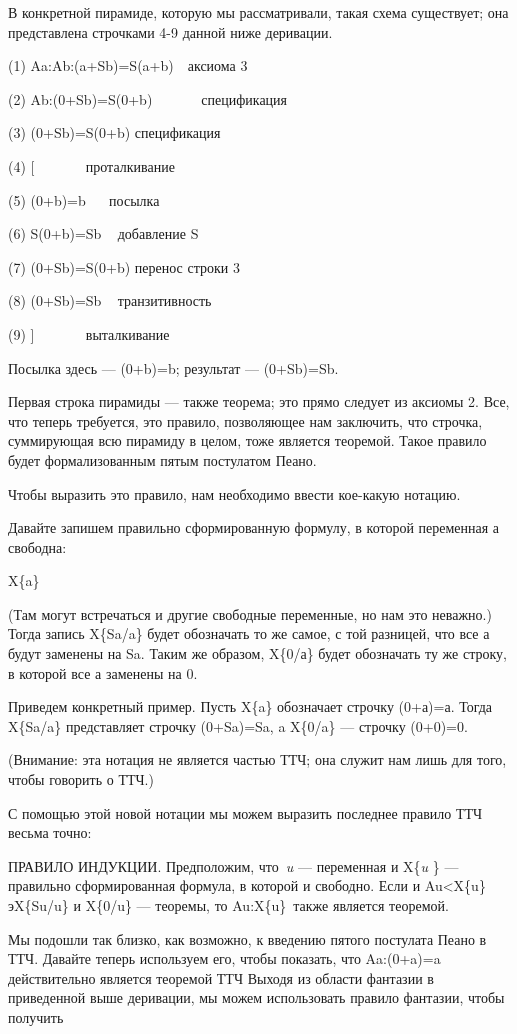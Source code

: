 \documentclass[../main.tex]{subfiles}
\begin{document}
В конкретной пирамиде, которую мы рассматривали, такая схема существует; она представлена строчками 4-9 данной ниже деривации.

(1) Aa:Ab:(a+Sb)=S(a+b)~~аксиома 3

(2) Ab:(0+Sb)=S(0+b)~~~~~~~спецификация

(3) (0+Sb)=S(0+b) спецификация

(4) {[} ~~~~~~ проталкивание

(5) (0+b)=b ~~ посылка

(6) S(0+b)=Sb ~ добавление S

(7) (0+Sb)=S(0+b) перенос строки 3

(8) (0+Sb)=Sb ~ транзитивность

(9) {]} ~~~~~~ выталкивание

Посылка здесь --- (0+b)=b; результат --- (0+Sb)=Sb.

Первая строка пирамиды --- также теорема; это прямо следует из аксиомы 2. Все, что теперь требуется, это правило, позволяющее нам заключить, что строчка, суммирующая всю пирамиду в целом, тоже является теоремой. Такое правило будет формализованным пятым постулатом Пеано.

Чтобы выразить это правило, нам необходимо ввести кое-какую нотацию.

Давайте запишем правильно сформированную формулу, в которой переменная а свободна:

X\{a\}

(Там могут встречаться и другие свободные переменные, но нам это неважно.) Тогда запись X\{Sa/a\} будет обозначать то же самое, с той разницей, что все а будут заменены на Sa. Таким же образом, X\{0/а\} будет обозначать ту же строку, в которой все а заменены на 0.

Приведем конкретный пример. Пусть X\{a\} обозначает строчку (0+а)=а. Тогда X\{Sa/a\} представляет строчку (0+Sa)=Sa, a X\{0/a\} --- строчку (0+0)=0.

(Внимание: эта нотация не является частью ТТЧ; она служит нам лишь для того, чтобы говорить о ТТЧ.)

С помощью этой новой нотации мы можем выразить последнее правило ТТЧ весьма точно:

ПРАВИЛО ИНДУКЦИИ. Предположим, что~\emph{u} --- переменная и X\{\emph{u} \} --- правильно сформированная формула, в которой и свободно. Если и Au\textless X\{u\}эX\{Su/u\} и X\{0/u\} --- теоремы, то Au:X\{u\}~также является теоремой.

Мы подошли так близко, как возможно, к введению пятого постулата Пеано в ТТЧ. Давайте теперь используем его, чтобы показать, что Aa:(0+a)=a действительно является теоремой ТТЧ Выходя из области фантазии в приведенной выше деривации, мы можем использовать правило фантазии, чтобы получить
\end{document}
